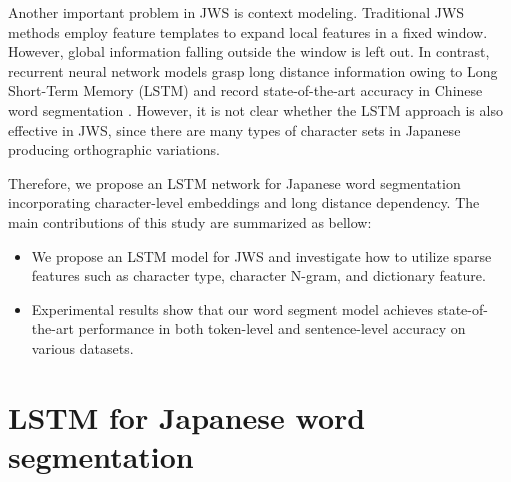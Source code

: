 \documentclass[11pt,letterpaper]{article}
\begin{document}
Another important problem in JWS is context modeling. Traditional JWS methods employ feature templates to expand local features in a fixed window. However, global information falling outside the window is left out. In contrast, recurrent neural network models grasp long distance information owing to Long Short-Term Memory (LSTM) and record state-of-the-art accuracy in Chinese word segmentation \cite{chen-EtAl:2015:EMNLP2}. 
However, it is not clear whether the LSTM approach is also effective in JWS, since there are many types of character sets in Japanese producing orthographic variations. 

Therefore, we propose an LSTM network for Japanese word segmentation incorporating character-level embeddings and long distance dependency.
The main contributions of this study are summarized as bellow:

\begin{itemize}

\item  We propose an LSTM model for JWS and investigate how to utilize sparse features such as character type, character N-gram, and dictionary feature. %

\item Experimental results show that our word segment model achieves state-of-the-art performance in both token-level and sentence-level accuracy on various datasets. 




\end{itemize}

\section{LSTM for Japanese word segmentation}
\end{document}
